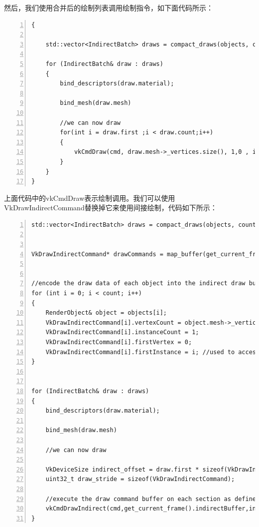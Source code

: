 \documentclass{ctexart}
\begin{document}
然后，我们使用合并后的绘制列表调用绘制指令，如下面代码所示：

\begin{lstlisting}[language={[ANSI]C},keywordstyle=\color{blue!70},commentstyle=\color{red!50!green!50!blue!50},frame=shadowbox, rulesepcolor=\color{red!20!green!20!blue!20},basicstyle=\small,numbers=left, numberstyle=\tiny,breaklines=true]
{

	std::vector<IndirectBatch> draws = compact_draws(objects, count);

	for (IndirectBatch& draw : draws)
	{
		bind_descriptors(draw.material);      

		bind_mesh(draw.mesh)

		//we can now draw
		for(int i = draw.first ;i < draw.count;i++)
		{       
			vkCmdDraw(cmd, draw.mesh->_vertices.size(), 1,0 , i /*using i to access matrix in the shader */   );
		}
	}
}
\end{lstlisting}

上面代码中的vkCmdDraw表示绘制调用。我们可以使用VkDrawIndirectCommand替换掉它来使用间接绘制，代码如下所示：


\begin{lstlisting}[language={[ANSI]C},keywordstyle=\color{blue!70},commentstyle=\color{red!50!green!50!blue!50},frame=shadowbox, rulesepcolor=\color{red!20!green!20!blue!20},basicstyle=\small,numbers=left, numberstyle=\tiny,breaklines=true]
std::vector<IndirectBatch> draws = compact_draws(objects, count);


VkDrawIndirectCommand* drawCommands = map_buffer(get_current_frame().indirectBuffer);


//encode the draw data of each object into the indirect draw buffer
for (int i = 0; i < count; i++)
{
	RenderObject& object = objects[i];
	VkDrawIndirectCommand[i].vertexCount = object.mesh->_vertices.size();
	VkDrawIndirectCommand[i].instanceCount = 1;
	VkDrawIndirectCommand[i].firstVertex = 0;
	VkDrawIndirectCommand[i].firstInstance = i; //used to access object matrix in the shader
}


for (IndirectBatch& draw : draws)
{
	bind_descriptors(draw.material);      

	bind_mesh(draw.mesh)

	//we can now draw

	VkDeviceSize indirect_offset = draw.first * sizeof(VkDrawIndirectCommand);
	uint32_t draw_stride = sizeof(VkDrawIndirectCommand);

	//execute the draw command buffer on each section as defined by the array of draws
	vkCmdDrawIndirect(cmd,get_current_frame().indirectBuffer,indirect_offset, draw.count,draw_stride);
}
\end{lstlisting}
\end{document}
